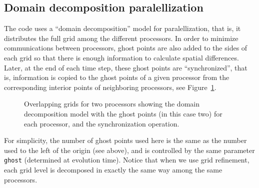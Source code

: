 \documentclass[12pt]{article}
\begin{document}
\subsection{Domain decomposition paralellization}

The code uses a ``domain decomposition'' model for paralellization,
that is, it distributes the full grid among the different
processors. In order to minimize communications between processors,
ghost points are also added to the sides of each grid so that there is
enough information to calculate spatial differences.  Later, at the
end of each time step, these ghost points are ``synchronized'', that
is, information is copied to the ghost points of a given processor
from the corresponding interior points of neighboring processors, see
Figure~\ref{fig:domaindecomp}. \\

\begin{figure}[h]
\begin{center}
\end{center}
\caption{Overlapping grids for two processors showing the domain
  decomposition model with the ghost points (in this case two) for
  each processor, and the synchronization operation.}
\label{fig:domaindecomp}
\end{figure}

For simplicity, the number of ghost points used here is the same as
the number used to the left of the origin (see above), and is
controlled by the same parameter \texttt{ghost} (determined at
evolution time). Notice that when we use grid refinement, each grid
level is decomposed in exactly the same way among the same
processors. \\
\end{document}
